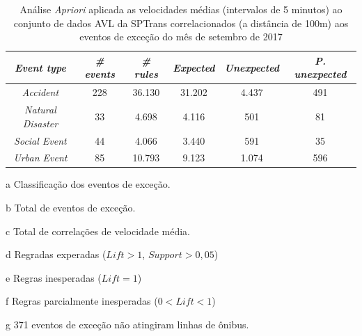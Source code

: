 \documentclass[
	12pt,				%
	oneside,			%
	a4paper,			%
	english,			%
	brazil				%
	]{abntex2ppgsi}
\begin{document}
\begin{apendicesenv}
\begin{table}[!htb]
\centering
\begin{threeparttable}
\caption {Análise \textit{Apriori} aplicada as velocidades médias (intervalos de 5 minutos) ao conjunto de dados AVL da SPTrans correlacionados (a distância de 100m) aos eventos de exceção do mês de setembro de 2017}
\label {tab:aprioriFull}
\begin{tabular}{c|c|c|c|c|c}
\hline
\textbf{\textit{Event type}}\tnote{a} & \textbf{\textit{\# events}}\tnote{b} & \textit{\textbf{\# rules}}\tnote{c} & \textbf{\textit{Expected}}\tnote{d} & \textbf{\textit{Unexpected}}\tnote{e} & \textbf{\textit{P. unexpected}}\tnote{f}   \\
\hline
\textit{Accident} & 228 & 36.130 & 31.202 & 4.437 & 491 \\
\textit{Natural Disaster} & 33 & 4.698 & 4.116 & 501 & 81 \\
\textit{Social Event} & 44 & 4.066 & 3.440 & 591 & 35 \\
\textit{Urban Event} & 85 & 10.793 & 9.123 & 1.074 & 596 \\
\hline
\end{tabular}
\begin{tablenotes}
            \item[a] Classificação dos eventos de exceção.
            \item[b] Total de eventos de exceção.
            \item[c] Total de correlações de velocidade média.
            \item[d] Regradas experadas ($Lift > 1$, $Support > 0,05$)
            \item[e] Regras inesperadas ($Lift = 1$)
            \item[f] Regras parcialmente inesperadas ($0 < Lift < 1$)
            \item[g] 371 eventos de exceção não atingiram linhas de ônibus.
        \end{tablenotes}
\end{threeparttable}
\end{table}


\end{apendicesenv}
\end{document}
